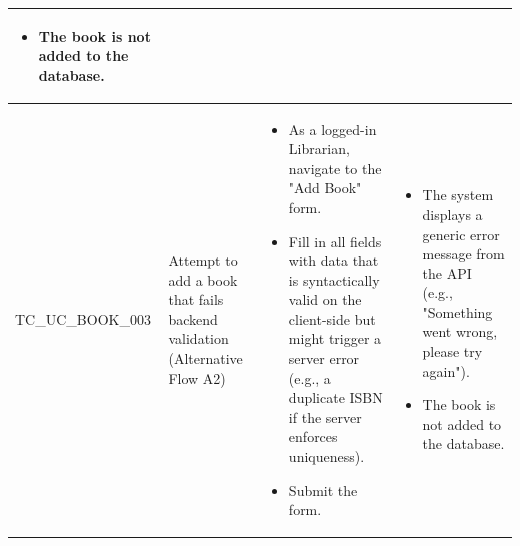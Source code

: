 \documentclass[10pt, a4paper]{report}
\begin{document}
\begin{longtable}{|>{\raggedright\arraybackslash}p{3.5cm}|>{\raggedright\arraybackslash}p{4cm}|>{\raggedright\arraybackslash}p{4cm}|>{\raggedright\arraybackslash}p{5cm}|}
\begin{itemize}[noitemsep, topsep=0pt, partopsep=0pt, leftmargin=*]
        \item The book is not added to the database.
    \end{itemize} \\ \hline
TC\_UC\_BOOK\_003 & Attempt to add a book that fails backend validation (Alternative Flow A2) & 
    \begin{itemize}[noitemsep, topsep=0pt, partopsep=0pt, leftmargin=*]
        \item As a logged-in Librarian, navigate to the "Add Book" form.
        \item Fill in all fields with data that is syntactically valid on the client-side but might trigger a server error (e.g., a duplicate ISBN if the server enforces uniqueness).
        \item Submit the form.
    \end{itemize} & 
    \begin{itemize}[noitemsep, topsep=0pt, partopsep=0pt, leftmargin=*]
        \item The system displays a generic error message from the API (e.g., "Something went wrong, please try again").
        \item The book is not added to the database.
    \end{itemize} \\ \hline


\end{longtable}
\end{document}
